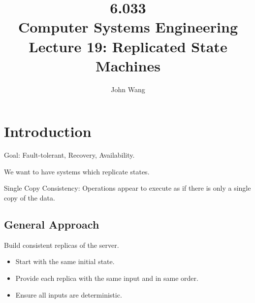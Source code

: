 \documentclass[psamsfonts]{amsart}
\title{6.033 \\
Computer Systems Engineering \\
Lecture 19: Replicated State Machines}
\author{John Wang}
\begin{document}
\maketitle

\section{Introduction}

Goal: Fault-tolerant, Recovery, Availability.

We want to have systems which replicate states. 

Single Copy Consistency: Operations appear to execute as if there is only a single copy of the data.

\subsection{General Approach}

Build consistent replicas of the server.
\begin{itemize}
  \item Start with the same initial state.
  \item Provide each replica with the same input and in same order.
  \item Ensure all inputs are deterministic.
\end{itemize}
\end{document}
